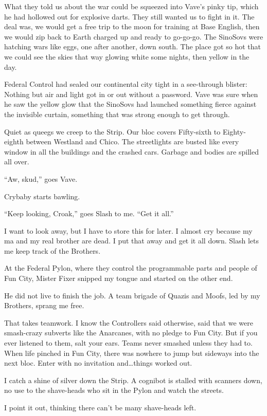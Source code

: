 What they told us about the war could be squeezed into Vave's pinky tip, which he had hollowed out for explosive darts. They still wanted us to fight in it. The deal was, we would get a free trip to the moon for training at Base English, then we would zip back to Earth charged up and ready to go-go-go. The SinoSovs were hatching wars like eggs, one after another, down south. The place got so hot that we could see the skies that way glowing white some nights, then yellow in the day.

Federal Control had sealed our continental city tight in a see-through blister: Nothing but air and light got in or out without a password. Vave was sure when he saw the yellow glow that the SinoSovs had launched something fierce against the invisible curtain, something that was strong enough to get through.

Quiet as queegs we creep to the Strip. Our bloc covers Fifty-sixth to Eighty-eighth between Westland and Chico. The streetlights are busted like every window in all the buildings and the crashed cars. Garbage and bodies are spilled all over.

``Aw, skud,'' goes Vave.

Crybaby starts bawling.

``Keep looking, Croak,'' goes Slash to me. ``Get it all.''

I want to look away, but I have to store this for later. I almost cry because my ma and my real brother are dead. I put that away and get it all down. Slash lets me keep track of the Brothers.

At the Federal Pylon, where they control the programmable parts and people of Fun City, Mister Fixer snipped my tongue and started on the other end.

He did not live to finish the job. A team brigade of Quazis and Moofs, led by my Brothers, sprang me free.

That takes teamwork. I know the Controllers said otherwise, said that we were smash-crazy subverts like the Anarcanes, with no pledge to Fun City. But if you ever listened to them, salt your ears. Teams never smashed unless they had to. When life pinched in Fun City, there was nowhere to jump but sideways into the next bloc. Enter with no invitation and\ldots things worked out.

I catch a shine of silver down the Strip. A cognibot is stalled with scanners down, no use to the shave-heads who sit in the Pylon and watch the streets.

I point it out, thinking there can't be many shave-heads left.

